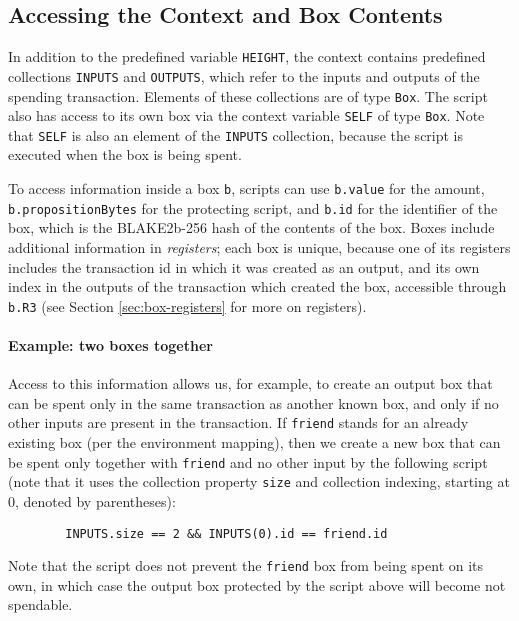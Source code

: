 \documentclass[11pt]{article}
\begin{document}
\subsection{Accessing the Context and Box Contents}
\label{sec:context}
In addition to the predefined variable \texttt{HEIGHT}, the context contains predefined collections \texttt{INPUTS} and \texttt{OUTPUTS}, which refer to the inputs and outputs of the spending transaction. Elements of these collections are of type \texttt{Box}. The script also has access to its own box via the context variable \texttt{SELF} of type \texttt{Box}. Note that \texttt{SELF} is also an element of the \texttt{INPUTS} collection, because the script is executed when the box is being spent.

To access information inside a box \texttt{b}, scripts can use \texttt{b.value} for the amount, \texttt{b.propositionBytes} for the protecting script, and \texttt{b.id} for the identifier of the box, which is the BLAKE2b-256 hash of the contents of the box. Boxes include additional information in \emph{registers};  each box is unique, because one of its registers includes the transaction id in which it was created as an output, and its own index in the outputs of the transaction which created the box, accessible through \texttt{b.R3} (see Section \ref{sec:box-registers} for more on registers).

\paragraph{Example: two boxes together}
Access to this information allows us, for example, to create an output box that can be spent only in the same transaction as another known box, and only if no other inputs are present in the transaction. If \texttt{friend} stands for an already existing box (per the environment mapping), then we create a new box that can be spent only together with \texttt{friend} and no other input by the following script (note that it uses the collection property \texttt{size} and collection indexing, starting at 0, denoted by parentheses):

\begin{verbatim}
        INPUTS.size == 2 && INPUTS(0).id == friend.id
\end{verbatim}

Note that the script does not prevent the \texttt{friend} box from being spent on its own, in which case the output box protected by the script above will become not spendable.
\end{document}
